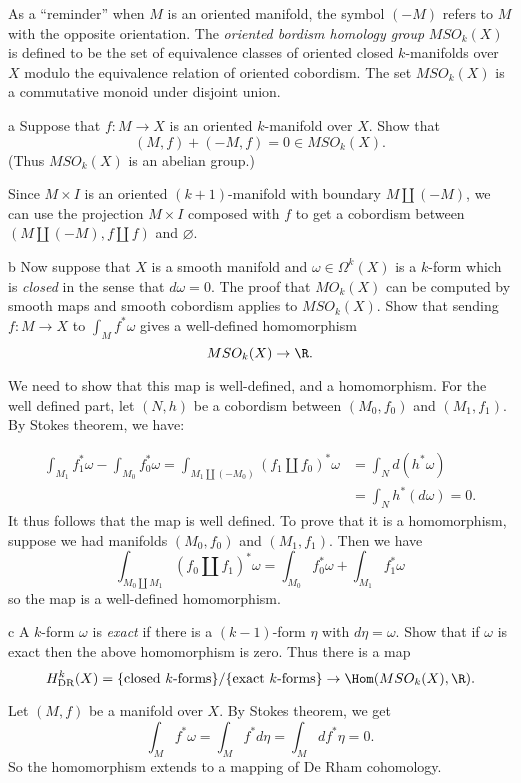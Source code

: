 \documentclass[11pt,letterpaper]{article}
\begin{document}
\begin{solution}
    \quad As a ``reminder'' when $M$ is an oriented manifold, the
symbol $(-M)$ refers to $M$ with the opposite orientation. The {\em oriented bordism homology group} $MSO_{k}(X)$ is defined to be the set
of equivalence classes of oriented closed $k$-manifolds over $X$ modulo the equivalence relation of oriented cobordism. The set $MSO_{k}(X)$ is a commutative monoid under disjoint union.
    \begin{partproblem}{a}
        Suppose that $f:M\to X$ is an oriented $k$-manifold over $X$.
    Show that 
    \[
    (M,f)+(-M,f)=0\in MSO_{k}(X).
    \]
    (Thus $MSO_{k}(X)$ is an abelian group.)
    \end{partproblem}

    \quad Since $M\times I$ is an oriented $(k+1)$-manifold with boundary $M \amalg (-M)$, we can use the projection $M\times I$ composed with $f$ to get a cobordism between $(M\amalg(-M), f \amalg f)$ and $\varnothing$. 

    \begin{partproblem}{b}
        Now suppose that $X$ is a smooth manifold and $\omega\in
    \Omega^{k}(X)$ is a $k$-form which is {\em closed} in the sense that
    $d\omega=0$. The proof that $MO_{k}(X)$ can be computed by smooth maps and smooth cobordism applies to $MSO_{k}(X)$.   Show that sending $f:M\to X$ to $\int_{M}f^{\ast}\omega$ gives a well-defined homomorphism
    \[
    MSO_{k}(X) \to \R.
    \]
    \end{partproblem}

    We need to show that this map is well-defined, and a homomorphism. For the well defined part, let $(N,h)$ be a cobordism between $(M_0,f_0)$ and $(M_1,f_1)$. By Stokes theorem, we have:

    \[
        \begin{aligned}
            \int_{M_1}f_1^*\omega - \int_{M_0}f_0^*\omega = \int_{M_1 \amalg (-M_0)} (f_1\amalg f_0)^*\omega &= \int_N d(h^*\omega) \\
            &= \int_N h^*(d\omega) = 0.
        \end{aligned}  
    \] 
    It thus follows that the map is well defined. To prove that it is a homomorphism, suppose we had manifolds $(M_0,f_0)$ and $(M_1,f_1)$. Then we have 
    \[
    \int_{M_0\amalg M_1} (f_0 \amalg f_1)^*\omega = \int_{M_0}f_0^*\omega + \int_{M_1} f_1^*\omega
    \]
    so the map is a well-defined homomorphism.

    
    \begin{partproblem}{c}
        A $k$-form $\omega$ is {\em exact} if there is a $(k-1)$-form $\eta$ with $d\eta=\omega$.  Show that if $\omega$ is exact then the above homomorphism is zero.  Thus there is a map
        \[
        H_{\text{DR}}^{k}(X) = \{\text{closed }k\text{-forms}\}/\{\text{exact }k\text{-forms} \} \to \Hom(MSO_{k}(X),\R).
        \]
    \end{partproblem}
    Let $(M,f)$ be a manifold over $X$. By Stokes theorem, we get
    \[
    \int_M f^*\omega = \int_M f^*d\eta = \int_M df^*\eta = 0.
    \]
    So the homomorphism extends to a mapping of De Rham cohomology.
\end{solution}
\end{document}

